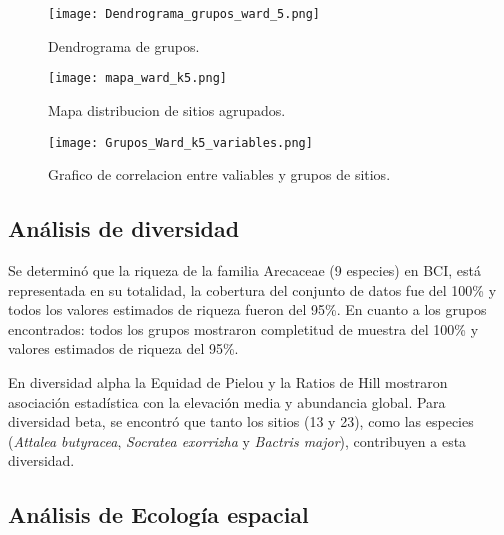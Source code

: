 \documentclass[11pt,]{article}
\begin{document}
\begin{figure}
\centering
\texttt{[image: Dendrograma\_grupos\_ward\_5.png]}
\caption{Dendrograma de grupos. \label{fig:Dendrograma_grupos_ward_5}}
\end{figure}

\begin{figure}
\centering
\texttt{[image: mapa\_ward\_k5.png]}
\caption{Mapa distribucion de sitios agrupados.
\label{fig:mapa_ward_k5}}
\end{figure}

\begin{figure}
\centering
\texttt{[image: Grupos\_Ward\_k5\_variables.png]}
\caption{Grafico de correlacion entre valiables y grupos de sitios.
\label{fig:Grupos_Ward_k5_variables}}
\end{figure}

\subsection{Análisis de diversidad}\label{anuxe1lisis-de-diversidad}

Se determinó que la riqueza de la familia Arecaceae (9 especies) en BCI,
está representada en su totalidad, la cobertura del conjunto de datos
fue del 100\% y todos los valores estimados de riqueza fueron del 95\%.
En cuanto a los grupos encontrados: todos los grupos mostraron
completitud de muestra del 100\% y valores estimados de riqueza del
95\%.

En diversidad alpha la Equidad de Pielou y la Ratios de Hill mostraron
asociación estadística con la elevación media y abundancia global. Para
diversidad beta, se encontró que tanto los sitios (13 y 23), como las
especies (\emph{Attalea butyracea}, \emph{Socratea exorrizha} y
\emph{Bactris major}), contribuyen a esta diversidad.

\subsection{Análisis de Ecología
espacial}\label{anuxe1lisis-de-ecologuxeda-espacial-1}
\end{document}
